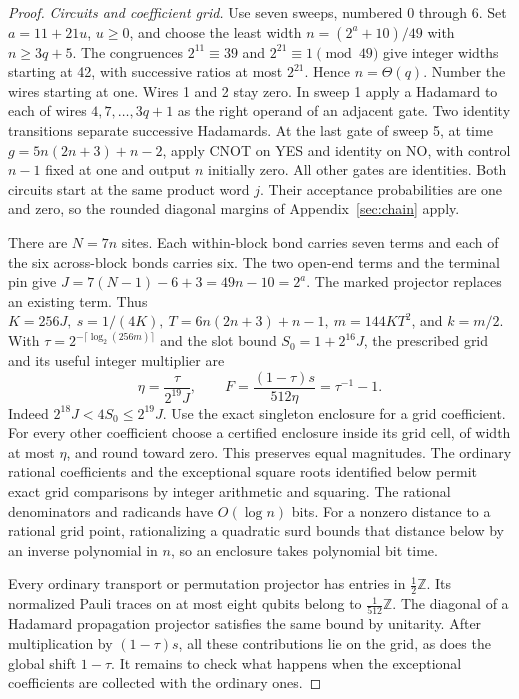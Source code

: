 \documentclass[11pt]{article}
\begin{document}
\begin{proof}
\emph{Circuits and coefficient grid.}
Use seven sweeps, numbered 0 through 6. Set \(a=11+21u\), \(u\ge0\), and choose the least width \(n=(2^a+10)/49\) with \(n\ge3q+5\). The congruences \(2^{11}\equiv39\) and \(2^{21}\equiv1\pmod{49}\) give integer widths starting at 42, with successive ratios at most \(2^{21}\). Hence \(n=\Theta(q)\). Number the wires starting at one. Wires 1 and 2 stay zero. In sweep 1 apply a Hadamard to each of wires \(4,7,\ldots,3q+1\) as the right operand of an adjacent gate. Two identity transitions separate successive Hadamards. At the last gate of sweep 5, at time \(g=5n(2n+3)+n-2\), apply CNOT on YES and identity on NO, with control \(n-1\) fixed at one and output \(n\) initially zero. All other gates are identities. Both circuits start at the same product word \(j\). Their acceptance probabilities are one and zero, so the rounded diagonal margins of Appendix~\ref{sec:chain} apply.

There are \(N=7n\) sites. Each within-block bond carries seven terms and each of the six across-block bonds carries six. The two open-end terms and the terminal pin give \(J=7(N-1)-6+3=49n-10=2^a\). The marked projector replaces an existing term. Thus \(K=256J,\ s=1/(4K),\ T=6n(2n+3)+n-1,\ m=144KT^2\), and \(k=m/2\). With \(\tau=2^{-\lceil\log_2(256m)\rceil}\) and the slot bound \(S_0=1+2^{16}J\), the prescribed grid and its useful integer multiplier are
\[
 \eta=\frac{\tau}{2^{19}J},\qquad F=\frac{(1-\tau)s}{512\eta}=\tau^{-1}-1.
\]
Indeed \(2^{18}J<4S_0\le 2^{19}J\). Use the exact singleton enclosure for a grid coefficient. For every other coefficient choose a certified enclosure inside its grid cell, of width at most \(\eta\), and round toward zero. This preserves equal magnitudes. The ordinary rational coefficients and the exceptional square roots identified below permit exact grid comparisons by integer arithmetic and squaring. The rational denominators and radicands have \(O(\log n)\) bits. For a nonzero distance to a rational grid point, rationalizing a quadratic surd bounds that distance below by an inverse polynomial in \(n\), so an enclosure takes polynomial bit time.

Every ordinary transport or permutation projector has entries in \(\tfrac12\mathbb Z\). Its normalized Pauli traces on at most eight qubits belong to \(\tfrac1{512}\mathbb Z\). The diagonal of a Hadamard propagation projector satisfies the same bound by unitarity. After multiplication by \((1-\tau)s\), all these contributions lie on the grid, as does the global shift \(1-\tau\). It remains to check what happens when the exceptional coefficients are collected with the ordinary ones.


\end{proof}
\end{document}
